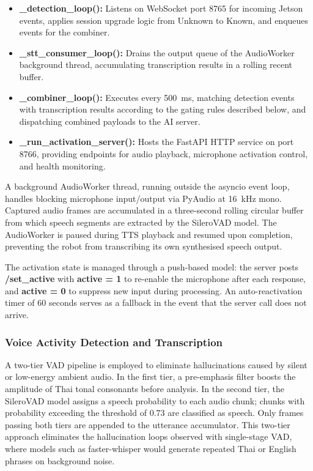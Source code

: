 \begin{itemize}
    \item \textbf{\_detection\_loop():} Listens on WebSocket port 8765 for incoming Jetson events, applies session upgrade logic from Unknown to Known, and enqueues events for the combiner.

    \item \textbf{\_stt\_consumer\_loop():} Drains the output queue of the AudioWorker background thread, accumulating transcription results in a rolling recent buffer.

    \item \textbf{\_combiner\_loop():} Executes every 500~ms, matching detection events with transcription results according to the gating rules described below, and dispatching combined payloads to the AI server.

    \item \textbf{\_run\_activation\_server():} Hosts the FastAPI HTTP service on port 8766, providing endpoints for audio playback, microphone activation control, and health monitoring.
\end{itemize}

A background AudioWorker thread, running outside the asyncio event loop, handles blocking microphone input/output via PyAudio at 16~kHz mono. Captured audio frames are accumulated in a three-second rolling circular buffer from which speech segments are extracted by the SileroVAD model. The AudioWorker is paused during TTS playback and resumed upon completion, preventing the robot from transcribing its own synthesised speech output.

The activation state is managed through a push-based model: the server posts \textbf{/set\_active} with \textbf{active = 1} to re-enable the microphone after each response, and \textbf{active = 0} to suppress new input during processing. An auto-reactivation timer of 60 seconds serves as a fallback in the event that the server call does not arrive.

\subsubsection{Voice Activity Detection and Transcription}

A two-tier VAD pipeline is employed to eliminate hallucinations caused by silent or low-energy ambient audio. In the first tier, a pre-emphasis filter boosts the amplitude of Thai tonal consonants before analysis. In the second tier, the SileroVAD model assigns a speech probability to each audio chunk; chunks with probability exceeding the threshold of 0.73 are classified as speech. Only frames passing both tiers are appended to the utterance accumulator. This two-tier approach eliminates the hallucination loops observed with single-stage VAD, where models such as faster-whisper would generate repeated Thai or English phrases on background noise.


